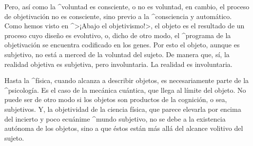 Pero, así como la ^{voluntad} es consciente, o no es voluntad, en
cambio, el proceso de objetivación no es consciente, sino previo a la
^{consciencia} y automático. Como hemos visto en ^>¡Abajo el
objetivismo!>, el objeto es el resultado de un proceso cuyo diseño es
evolutivo, o, dicho de otro modo, el ^{programa} de la objetivación se
encuentra codificado en los genes. Por esto el objeto, aunque es
subjetivo, no está a merced de la voluntad del sujeto. De manera que,
sí, la realidad objetiva es subjetiva, pero involuntaria. La realidad es
involuntaria.

Hasta la ^{física}, cuando alcanza a describir objetos, es
necesariamente parte de la ^{psicología}. Es el caso de la mecánica
cuántica, que llega al límite del objeto. No puede ser de otro modo si
los objetos son productos de la cognición, o sea, subjetivos. Y, la
objetividad de la ciencia física, que parece elevarla por encima del
incierto y poco ecuánime ^{mundo} subjetivo, no se debe a la existencia
autónoma de los objetos, sino a que éstos están más allá del alcance
volitivo del sujeto.

\endinput
